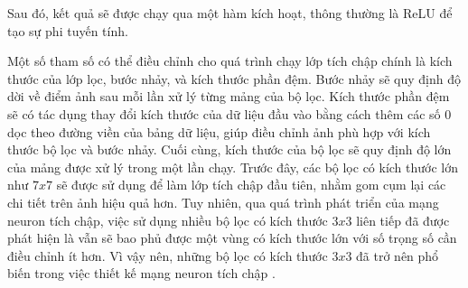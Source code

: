 Sau đó, kết quả sẽ được chạy qua một hàm kích hoạt, thông thường là ReLU để tạo sự phi tuyến tính.

Một số tham số có thể điều chỉnh cho quá trình chạy lớp tích chập chính là kích thước của lớp lọc, bước nhảy, và kích thước phần đệm. Bước nhảy sẽ quy định độ dời về điểm ảnh sau mỗi lần xử lý từng mảng của bộ lọc. Kích thước phần đệm sẽ có tác dụng thay đổi kích thước của dữ liệu đầu vào bằng cách thêm các số 0 dọc theo đường viền của bảng dữ liệu, giúp điều chỉnh ảnh phù hợp với kích thước bộ lọc và bước nhảy. Cuối cùng, kích thước của bộ lọc sẽ quy định độ lớn của mảng được xử lý trong một lần chạy. Trước đây, các bộ lọc có kích thước lớn như $7x7$ sẽ được sử dụng để làm lớp tích chập đầu tiên, nhằm gom cụm lại các chi tiết trên ảnh hiệu quả hơn. Tuy nhiên, qua quá trình phát triển của mạng neuron tích chập, việc sử dụng nhiều bộ lọc có kích thước $3x3$ liên tiếp đã được phát hiện là vẫn sẽ bao phủ được một vùng có kích thước lớn với số trọng số cần điều chỉnh ít hơn. Vì vậy nên, những bộ lọc có kích thước $3x3$ đã trở nên phổ biến trong việc thiết kế mạng neuron tích chập \cite{simonyan2015deep}.


